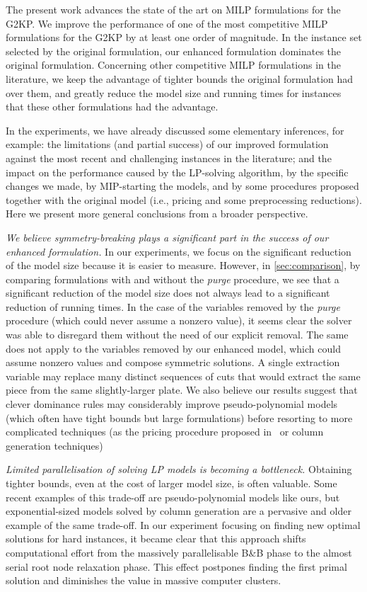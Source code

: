 \documentclass[smallextended]{svjour3}       %
\begin{document}
The present work advances the state of the art on MILP formulations for the G2KP.
We improve the performance of one of the most competitive MILP formulations for the G2KP by at least one order of magnitude.
In the instance set selected by the original formulation, our enhanced formulation dominates the original formulation.
Concerning other competitive MILP formulations in the literature, we keep the advantage of tighter bounds the original formulation had over them, and greatly reduce the model size and running times for instances that these other formulations had the advantage.

In the experiments, we have already discussed some elementary inferences, for example: the limitations (and partial success) of our improved formulation against the most recent and challenging instances in the literature; and the impact on the performance caused by the LP-solving algorithm, by the specific changes we made, by MIP-starting the models, and by some procedures proposed together with the original model (i.e., pricing and some preprocessing reductions).
Here we present more general conclusions from a broader perspective.

\emph{We believe symmetry-breaking plays a significant part in the success of our enhanced formulation.}
In our experiments, we focus on the significant reduction of the model size because it is easier to measure.
However, in \autoref{sec:comparison}, by comparing formulations with and without the \emph{purge} procedure, we see that a significant reduction of the model size does not always lead to a significant reduction of running times.
In the case of the variables removed by the \emph{purge} procedure (which could never assume a nonzero value), it seems clear the solver was able to disregard them without the need of our explicit removal.
The same does not apply to the variables removed by our enhanced model, which could assume nonzero values and compose symmetric solutions.
A single extraction variable may replace many distinct sequences of cuts that would extract the same piece from the same slightly-larger plate.
We also believe our results suggest that clever dominance rules may considerably improve pseudo-polynomial models (which often have tight bounds but large formulations) before resorting to more complicated techniques (as the pricing procedure proposed in~\cite{furini:2016} or column generation techniques)

\emph{Limited parallelisation of solving LP models is becoming a bottleneck.}
Obtaining tighter bounds, even at the cost of larger model size, is often valuable.
Some recent examples of this trade-off are pseudo-polynomial models like ours, but exponential-sized models solved by column generation are a pervasive and older example of the same trade-off.
In our experiment focusing on finding new optimal solutions for hard instances, it became clear that this approach shifts computational effort from the massively parallelisable B\&B phase to the almost serial root node relaxation phase.
This effect postpones finding the first primal solution and diminishes the value in massive computer clusters.
\end{document}
